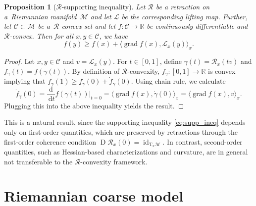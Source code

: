 \documentclass[11pt,reqno]{amsart}
\theoremstyle{plain}
\newtheorem{prop}[thm]{Proposition}
\newcommand\R{\mathbb R}
\DeclareMathOperator{\Drm}{D}
\DeclareMathOperator{\grad}{grad}
\DeclareMathOperator{\id}{id}
\def\drm{\text{d}}
\def\dt{\,\text{d}t}
\newcommand\calC{\mathcal C}
\newcommand{\M}{\mathcal{M}}
\newcommand{\Tan}{\mathrm{T}}
\newcommand{\Ret}{\mathcal R}
\newcommand{\invRet}{\mathcal L}
\begin{document}
	\begin{prop}[$\Ret$-supporting inequality]\label{prop:R_supp_ineq}
		Let $\Ret$ be a retraction on a~Riemannian mani\-fold~$\M$ and let $\invRet$ be the corresponding lifting map. Further, let $\calC \subset \M$ be a~$\Ret$-convex set and let $f : \calC \to  \R$ be continuously differentiable and $\Ret$-convex. Then for all $x,y \in \calC$, we have 
		\begin{equation}\label{eq:supp_ineq}
			f(y) \ge f(x) + \langle \grad f(x), \invRet_x(y) \rangle_x.
		\end{equation}
	\end{prop}
	\begin{proof}
		Let $x,y \in \calC$ and $v = \invRet_x(y)$. 
		For $t \in [0,1]$, define $\gamma(t) = \Ret_x(tv)$ and $f_\gamma(t) = f(\gamma(t))$. By definition of  $\Ret$-convexity, $f_\gamma : [0,1] \to \R$ is convex implying that $f_\gamma(1) \ge f_\gamma(0) + \dot{f}_\gamma(0)$. Using chain rule, we calculate
		\[
		\dot{f}_\gamma(0) = \frac{\drm}{\dt}  f(\gamma(t))\bigg|_{t=0}
		= \langle \grad f(x), \dot \gamma (0) \rangle_x 
		= \langle \grad f(x), v \rangle_x.
		\]
		Plugging this into the above inequality yields the result.
	\end{proof}
	
	This is a natural result, since the supporting inequality \eqref{eq:supp_ineq} depends only on first-order quantities, which are preserved by retractions through the first-order coherence condition $\Drm \Ret_x(0)=\id_{\Tan_x\M}$. In contrast, second-order quantities, such as Hessian-based characterizations and curvature, are in general not transferable to the $\Ret$-convexity framework.
	
	
	\section{Riemannian coarse model}\label{sec:coarse_model}
	
\end{document}
